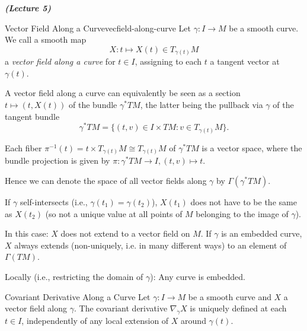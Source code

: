

\vspace{0.4cm}\emph{\textbf{(Lecture 5)}}\\

\begin{colordef}{Vector Field Along a Curve}{vecfield-along-curve}
Let $\gamma: I \to M$ be a smooth curve. We call a smooth map
\[
X:t \longmapsto X(t) \in T_{\gamma(t)} M
\]
a \emph{vector field along a curve} for $t \in I$, assigning to each $t$ a tangent vector at $\gamma(t)$. 
\end{colordef}

A vector field along a curve can equivalently be seen as a section $t\mapsto(t,X(t))$ of the bundle $\gamma^* TM$, the latter being the pullback via $\gamma$ of the tangent bundle
$$\gamma^* TM = \{(t,v) \in I \times TM : v \in T_{\gamma(t)} M\}.$$

Each fiber $\pi^{-1}(t) = {t}\times T_{\gamma(t)}M \cong T_{\gamma(t)}M$
of $\gamma^* TM$ is a vector space, where the bundle projection is given by $\pi: \gamma^* TM \to I, (t,v) \mapsto t$.

Hence we can denote the space of all vector fields along $\gamma$ by $\Gamma(\gamma^* TM)$.

\begin{colremark}
If $\gamma$ self-intersects (i.e., $\gamma(t_1) = \gamma(t_2)$), $X(t_1)$ does not have to be the same as $X(t_2)$ (so not a unique value at all points of $M$ belonging to the image of $\gamma$).

In this case: $X$ does not extend to a vector field on $M$. If $\gamma$ is an embedded curve, $X$ always extends (non-uniquely, i.e. in many different ways) to an element of $\Gamma(TM)$.

Locally (i.e., restricting the domain of $\gamma$): Any curve is embedded.
\end{colremark}



\begin{colorlem}{Covariant Derivative Along a Curve}{}
Let $\gamma: I \to M$ be a smooth curve and $X$ a vector field along $\gamma$. The covariant derivative $\nabla_{\dot{\gamma}} X$ is uniquely defined at each $t \in I$, independently of any local extension of $X$ around $\gamma(t)$.
\end{colorlem}

